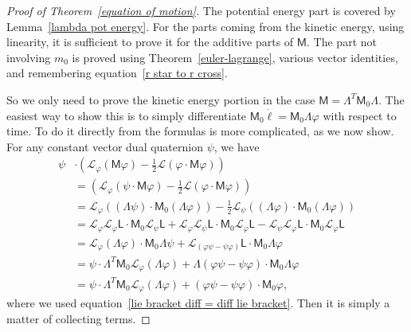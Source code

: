 \documentclass[reqno,12pt]{amsart}
\newcommand{\liederiv}{\mathcal L}
\begin{document}
\begin{proof}[Proof of Theorem~\ref{equation of motion}] The potential energy part is covered by Lemma~\ref{lambda pot energy}.  For the parts coming from the kinetic energy, using linearity, it is sufficient to prove it for the additive parts of $\mathsf M$.  The part not involving $m_0$ is proved using Theorem~\ref{euler-lagrange}, various vector identities, and remembering equation~\eqref{r star to r cross}.

So we only need to prove the kinetic energy portion in the case $\mathsf M = \mathsf \Lambda^T \mathsf M_0 \mathsf \Lambda$.  The easiest way to show this is to simply differentiate $\mathsf M_0 \dot \ell = \mathsf M_0 \mathsf\Lambda\varphi$ with respect to time.  To do it directly from the formulas is more complicated, as we now show.  For any constant vector dual quaternion $\psi$, we have
\begin{equation}
\begin{aligned}
\psi &\cdot (\liederiv_\varphi(\mathsf M \varphi) - \tfrac12 \liederiv(\varphi \cdot \mathsf M \varphi)) \\
&= (\liederiv_\varphi(\psi \cdot \mathsf M \varphi) - \tfrac12 \liederiv(\varphi \cdot \mathsf M \varphi)) \\
&= \liederiv_\varphi ((\mathsf \Lambda \psi) \cdot \mathsf M_0 (\mathsf \Lambda \varphi))
- \tfrac12 \liederiv_\psi  ((\mathsf \Lambda \varphi) \cdot \mathsf M_0(\mathsf \Lambda \varphi)) \\
&= \liederiv_\varphi \liederiv_\varphi \mathsf L \cdot \mathsf M_0 \liederiv_\psi \mathsf L
+ \liederiv_\varphi \liederiv_\psi \mathsf L \cdot \mathsf M_0\liederiv_\varphi \mathsf L - \liederiv_\psi \liederiv_\varphi \mathsf L \cdot \mathsf M_0\liederiv_\varphi \mathsf L \\
&= \liederiv_\varphi (\mathsf\Lambda \varphi) \cdot \mathsf M_0\mathsf\Lambda \psi
+ \liederiv_{(\varphi \psi - \psi \varphi)} \mathsf L \cdot \mathsf M_0\mathsf\Lambda \varphi \\
&= \psi \cdot \mathsf\Lambda^T \mathsf M_0 \liederiv_\varphi (\mathsf \Lambda \varphi)
+ \mathsf \Lambda (\varphi\psi - \psi\varphi) \cdot \mathsf M_0 \mathsf \Lambda \varphi
\\
&= \psi \cdot \mathsf\Lambda^T \mathsf M_0\liederiv_\varphi (\mathsf \Lambda \varphi)
+ (\varphi\psi - \psi\varphi) \cdot \mathsf M_0 \varphi,
\end{aligned}
\end{equation}
where we used equation~\eqref{lie bracket diff = diff lie bracket}.  Then it is simply a matter of collecting terms.
\end{proof}
\end{document}
